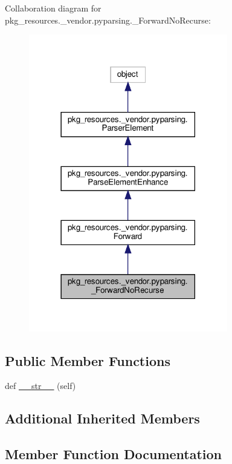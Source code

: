 Collaboration diagram for pkg\+\_\+resources.\+\_\+vendor.\+pyparsing.\+\_\+\+Forward\+No\+Recurse\+:
\nopagebreak
\begin{figure}[H]
\begin{center}
\leavevmode
\includegraphics[width=246pt]{classpkg__resources_1_1__vendor_1_1pyparsing_1_1__ForwardNoRecurse__coll__graph}
\end{center}
\end{figure}
\subsection*{Public Member Functions}
\begin{DoxyCompactItemize}
\item 
def \hyperlink{classpkg__resources_1_1__vendor_1_1pyparsing_1_1__ForwardNoRecurse_a8fea61e8e795e5fb05d493450b1e4c6f}{\+\_\+\+\_\+str\+\_\+\+\_\+} (self)
\end{DoxyCompactItemize}
\subsection*{Additional Inherited Members}


\subsection{Member Function Documentation}
\mbox{\label{classpkg__resources_1_1__vendor_1_1pyparsing_1_1__ForwardNoRecurse_a8fea61e8e795e5fb05d493450b1e4c6f}} 
